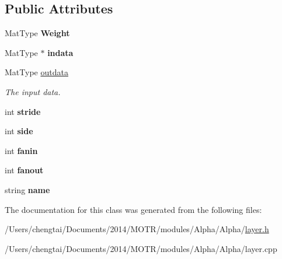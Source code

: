 \subsection*{Public Attributes}
\begin{DoxyCompactItemize}
\item 
\hypertarget{class_fully_connected_layer_a3cf0cc240abfd47b8ce17c0f9886612b}{Mat\+Type {\bfseries Weight}}\label{class_fully_connected_layer_a3cf0cc240abfd47b8ce17c0f9886612b}

\item 
\hypertarget{class_fully_connected_layer_aa06f43fdb5f8d9bd9ae2f4501d5eea72}{Mat\+Type $\ast$ {\bfseries indata}}\label{class_fully_connected_layer_aa06f43fdb5f8d9bd9ae2f4501d5eea72}

\item 
\hypertarget{class_fully_connected_layer_a9dc1c3ddd28ba88594438e9029493cee}{Mat\+Type \hyperlink{class_fully_connected_layer_a9dc1c3ddd28ba88594438e9029493cee}{outdata}}\label{class_fully_connected_layer_a9dc1c3ddd28ba88594438e9029493cee}

\begin{DoxyCompactList}\small\item\em The input data. \end{DoxyCompactList}\item 
\hypertarget{class_fully_connected_layer_a35d64d38efc0d0be3f79b8f82835579c}{int {\bfseries stride}}\label{class_fully_connected_layer_a35d64d38efc0d0be3f79b8f82835579c}

\item 
\hypertarget{class_fully_connected_layer_adff134355829fd3e2944b7b304c6bd0f}{int {\bfseries side}}\label{class_fully_connected_layer_adff134355829fd3e2944b7b304c6bd0f}

\item 
\hypertarget{class_fully_connected_layer_aed6f8602d64c19b1086e99e00edf09d1}{int {\bfseries fanin}}\label{class_fully_connected_layer_aed6f8602d64c19b1086e99e00edf09d1}

\item 
\hypertarget{class_fully_connected_layer_a6f06e1152dedcc402cb69161293a818e}{int {\bfseries fanout}}\label{class_fully_connected_layer_a6f06e1152dedcc402cb69161293a818e}

\item 
\hypertarget{class_fully_connected_layer_a0f1df8475560dd0fd422f1da735f6993}{string {\bfseries name}}\label{class_fully_connected_layer_a0f1df8475560dd0fd422f1da735f6993}

\end{DoxyCompactItemize}


The documentation for this class was generated from the following files\+:\begin{DoxyCompactItemize}
\item 
/\+Users/chengtai/\+Documents/2014/\+M\+O\+T\+R/modules/\+Alpha/\+Alpha/\hyperlink{layer_8h}{layer.\+h}\item 
/\+Users/chengtai/\+Documents/2014/\+M\+O\+T\+R/modules/\+Alpha/\+Alpha/layer.\+cpp\end{DoxyCompactItemize}
